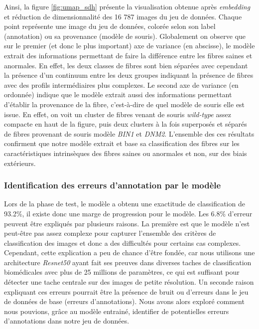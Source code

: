 Ainsi, la figure \ref{fig:umap_sdh} présente la visualisation obtenue après \textit{embedding} et réduction de dimensionnalité des 16 787 images du jeu de données. Chaque point représente une image du jeu de données, colorée selon son label (annotation) ou sa provenance (modèle de souris). Globalement on observe que sur le premier (et donc le plus important) axe de variance (en abscisse), le modèle extrait des informations permettant de faire la différence entre les fibres saines et anormales. En effet, les deux classes de fibres sont bien séparées avec cependant la présence d'un continuum entre les deux groupes indiquant la présence de fibres avec des profils intermédiaires plus complexes. Le second axe de variance (en ordonnée) indique que le modèle extrait aussi des informations permettant d'établir la provenance de la fibre, c'est-à-dire de quel modèle de souris elle est issue. En effet, on voit un cluster de fibres venant de souris \textit{wild-type} assez compacte en haut de la figure, puis deux clusters à la fois superposés et séparés de fibres provenant de souris modèle \textit{BIN1} et \textit{DNM2}. L'ensemble des ces résultats confirment que notre modèle extrait et base sa classification des fibres sur les caractéristiques intrinsèques des fibres saines ou anormales et non, sur des biais extérieurs.

\subsubsection{Identification des erreurs d'annotation par le modèle}
Lors de la phase de test, le modèle a obtenu une exactitude de classification de 93.2\%, il existe donc une marge de progression pour le modèle. Les 6.8\% d'erreur peuvent être expliqués par plusieurs raisons. La première est que le modèle n'est peut-être pas assez complexe pour capturer l'ensemble des critères de classification des images et donc a des difficultés pour certains cas complexes. Cependant, cette explication a peu de chance d'être fondée, car nous utilisons une architecture \textit{Resnet50} ayant fait ses preuves dans diverses taches de classification biomédicales avec plus de 25 millions de paramètres, ce qui est suffisant pour détecter une tache centrale sur des images de petite résolution. Un seconde raison expliquant ces erreurs pourrait être la présence de bruit ou d'erreurs dans le jeu de données de base (erreurs d'annotations). Nous avons alors exploré comment nous pouvions, grâce au modèle entrainé, identifier de potentielles erreurs d'annotations dans notre jeu de données.

